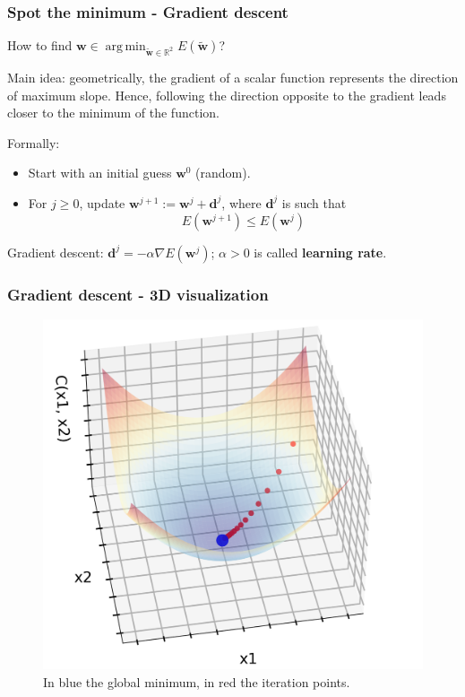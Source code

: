 \documentclass{beamer}
\DeclareMathOperator*{\argmin}{arg\,min}
\begin{document}
	\begin{frame}
		\frametitle{Spot the minimum - Gradient descent}
		How to find $\bm{w} \in \argmin_{\tilde{\bm{w}} \in \mathbb{R}^2} E(\tilde{\bm{w}})$?
		
		\vspace{5mm}
		
		Main idea: geometrically, the gradient of a scalar function represents the direction of maximum slope. Hence, following the direction opposite to the gradient leads closer to the minimum of the function.
		
		\vspace{5mm}
		
		Formally:
		\begin{itemize}
			\item Start with an initial guess $\bm{w}^0$ (random).
			\item For $j \geq 0$, update $\bm{w}^{j+1} := \bm{w}^{j} + \bm{d}^j$, where $\bm{d}^j$ is such that
			\begin{equation*}
				E(\bm{w}^{j+1}) \leq E(\bm{w}^j) 
			\end{equation*}
		\end{itemize}
		Gradient descent: $\bm{d}^j = - \alpha \nabla E(\bm{w}^j)$; $\alpha>0$ is called \textbf{learning rate}.
	\end{frame}

	\begin{frame}
		\frametitle{Gradient descent - 3D visualization}
		\begin{figure}
			\centering
			\includegraphics[scale=0.4]{images/gradient_descent_3D}
			\caption{In blue the global minimum, in red the iteration points.}
		\end{figure}
	\end{frame}
\end{document}
